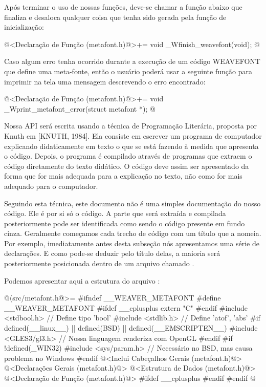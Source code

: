 Após terminar o uso de nossas funções, deve-se chamar a função abaixo
que finaliza e desaloca qualquer coisa que tenha sido gerada pela
função de inicialização:

\iniciocodigo
@<Declaração de Função (metafont.h)@>+=
void _Wfinish_weavefont(void);
@
\fimcodigo

Caso algum erro tenha ocorrido durante a execução de um código
WEAVEFONT que define uma meta-fonte, então o usuário poderá usar a
seguinte função para imprimir na tela uma mensagem descrevendo o erro
encontrado:

\iniciocodigo
@<Declaração de Função (metafont.h)@>+=
void _Wprint_metafont_error(struct metafont *);
@
\fimcodigo



Nossa API será escrita usando a técnica de Programação Literária,
proposta por Knuth em [KNUTH, 1984]. Ela consiste em escrever um
programa de computador explicando didaticamente em texto o que se está
fazendo à medida que apresenta o código. Depois, o programa é
compilado através de programas que extraem o código diretamente do
texto didático. O código deve assim ser apresentado da forma que for
mais adequada para a explicação no texto, não como for mais adequado
para o computador.

Seguindo esta técnica, este documento não é uma simples documentação
do nosso código. Ele é por si só o código. A parte que será extraída e
compilada posteriormente pode ser identificada como sendo o código
presente em fundo cinza. Geralmente começamos cada trecho de código
com um título que a nomeia. Por exemplo, imediatamente antes desta
subseção nós apresentamos uma série de declarações. E como pode-se
deduzir pelo título delas, a maioria será posteriormente posicionada
dentro de um arquivo chamado .

Podemos apresentar aqui a estrutura do arquivo
:

\iniciocodigo
@(src/metafont.h@>=
#ifndef __WEAVER_METAFONT
#define __WEAVER_METAFONT
#ifdef __cplusplus
extern "C" {
#endif
#include <stdbool.h> // Define tipo 'bool'
#include <stdlib.h>  // Define 'atof', 'abs'
#if defined(__linux__) || defined(BSD) || defined(__EMSCRIPTEN__)
#include <GLES3/gl3.h> // Nossa linguagem renderiza com OpenGL
#endif
#if !defined(_WIN32)
#include <sys/param.h> // Necessário no BSD, mas causa problema no Windows
#endif
@<Inclui Cabeçalhos Gerais (metafont.h)@>
@<Declarações Gerais (metafont.h)@>
@<Estrutura de Dados (metafont.h)@>
@<Declaração de Função (metafont.h)@>
#ifdef __cplusplus
}
#endif
#endif
@
\fimcodigo

